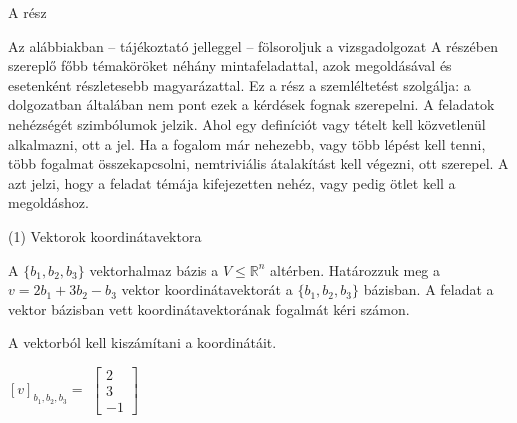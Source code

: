 

\begin{frame}[plain]
\begin{tcolorbox}[center, colback={myyellow}, coltext={black}, colframe={myyellow}]
    {\RHuge  A rész}
    \mmedskip
\end{tcolorbox}
\end{frame}

\begin{frame}
  \begin{tcolorbox}
Az alábbiakban – tájékoztató jelleggel – fölsoroljuk a vizsgadolgozat A részében szereplő főbb témaköröket néhány mintafeladattal, azok megoldásával és esetenként részletesebb magyarázattal. Ez a rész a szemléltetést szolgálja: a dolgozatban általában nem pont ezek a kérdések fognak szerepelni. A feladatok nehézségét szimbólumok jelzik. Ahol egy definíciót vagy tételt kell közvetlenül alkalmazni, ott {\symknight} a jel. Ha a fogalom már nehezebb, vagy több lépést kell tenni, több fogalmat összekapcsolni, nemtriviális átalakítást kell végezni, ott {\symrook} szerepel. A {\symqueen} azt jelzi, hogy a feladat témája kifejezetten nehéz, vagy pedig ötlet kell a megoldáshoz.
  \end{tcolorbox}
\end{frame}

\begin{frame}[plain]
\begin{tcolorbox}[center, colback={myyellow}, coltext={black}, colframe={myyellow}]
    {\RHuge  (1) Vektorok koordinátavektora}
    \mmedskip
\end{tcolorbox}
\end{frame}

\begin{frame}
  \begin{tcolorbox}[title={1/1. {\symknight}}]
      A $\{b_1,b_2,b_3\}$ vektorhalmaz bázis a $V \leq \mathbb{R}^n$ altérben. Határozzuk meg a $v = 2b_1 + 3b_2 -b_3$ vektor koordinátavektorát a $\{b_1,b_2,b_3\}$ bázisban.
  \tcblower
    A feladat a vektor bázisban vett koordinátavektorának fogalmát kéri számon.\\
    \mmedskip
    
    A vektorból kell kiszámítani a koordinátáit.\\
    \mmedskip 
  
   $[v]_{b_1,b_2,b_3} =$ $\begin{bmatrix} 
  				2  \\
  				3 \\
  				-1
			\end{bmatrix}$
  \end{tcolorbox}
\end{frame}

